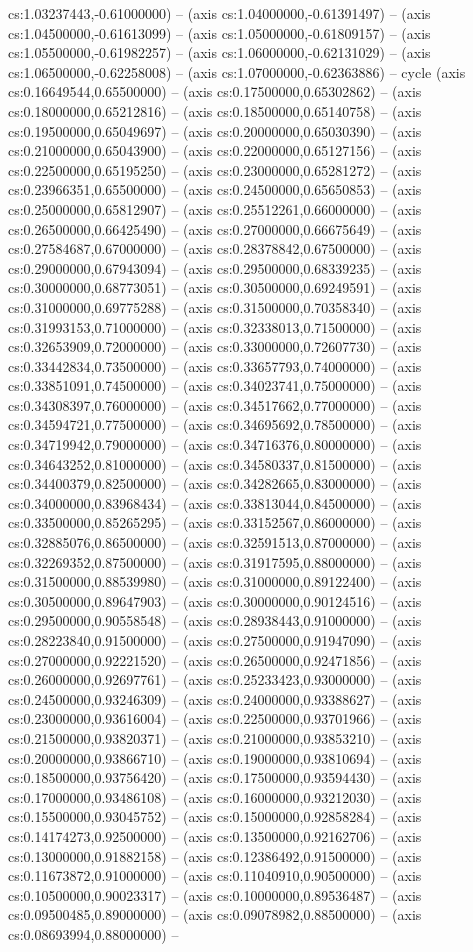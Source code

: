 cs:1.03237443,-0.61000000) -- (axis cs:1.04000000,-0.61391497) -- (axis cs:1.04500000,-0.61613099) -- (axis cs:1.05000000,-0.61809157) -- (axis cs:1.05500000,-0.61982257) -- (axis cs:1.06000000,-0.62131029) -- (axis cs:1.06500000,-0.62258008) -- (axis cs:1.07000000,-0.62363886) -- cycle (axis cs:0.16649544,0.65500000) -- (axis cs:0.17500000,0.65302862) -- (axis cs:0.18000000,0.65212816) -- (axis cs:0.18500000,0.65140758) -- (axis cs:0.19500000,0.65049697) -- (axis cs:0.20000000,0.65030390) -- (axis cs:0.21000000,0.65043900) -- (axis cs:0.22000000,0.65127156) -- (axis cs:0.22500000,0.65195250) -- (axis cs:0.23000000,0.65281272) -- (axis cs:0.23966351,0.65500000) -- (axis cs:0.24500000,0.65650853) -- (axis cs:0.25000000,0.65812907) -- (axis cs:0.25512261,0.66000000) -- (axis cs:0.26500000,0.66425490) -- (axis cs:0.27000000,0.66675649) -- (axis cs:0.27584687,0.67000000) -- (axis cs:0.28378842,0.67500000) -- (axis cs:0.29000000,0.67943094) -- (axis cs:0.29500000,0.68339235) -- (axis cs:0.30000000,0.68773051) -- (axis cs:0.30500000,0.69249591) -- (axis cs:0.31000000,0.69775288) -- (axis cs:0.31500000,0.70358340) -- (axis cs:0.31993153,0.71000000) -- (axis cs:0.32338013,0.71500000) -- (axis cs:0.32653909,0.72000000) -- (axis cs:0.33000000,0.72607730) -- (axis cs:0.33442834,0.73500000) -- (axis cs:0.33657793,0.74000000) -- (axis cs:0.33851091,0.74500000) -- (axis cs:0.34023741,0.75000000) -- (axis cs:0.34308397,0.76000000) -- (axis cs:0.34517662,0.77000000) -- (axis cs:0.34594721,0.77500000) -- (axis cs:0.34695692,0.78500000) -- (axis cs:0.34719942,0.79000000) -- (axis cs:0.34716376,0.80000000) -- (axis cs:0.34643252,0.81000000) -- (axis cs:0.34580337,0.81500000) -- (axis cs:0.34400379,0.82500000) -- (axis cs:0.34282665,0.83000000) -- (axis cs:0.34000000,0.83968434) -- (axis cs:0.33813044,0.84500000) -- (axis cs:0.33500000,0.85265295) -- (axis cs:0.33152567,0.86000000) -- (axis cs:0.32885076,0.86500000) -- (axis cs:0.32591513,0.87000000) -- (axis cs:0.32269352,0.87500000) -- (axis cs:0.31917595,0.88000000) -- (axis cs:0.31500000,0.88539980) -- (axis cs:0.31000000,0.89122400) -- (axis cs:0.30500000,0.89647903) -- (axis cs:0.30000000,0.90124516) -- (axis cs:0.29500000,0.90558548) -- (axis cs:0.28938443,0.91000000) -- (axis cs:0.28223840,0.91500000) -- (axis cs:0.27500000,0.91947090) -- (axis cs:0.27000000,0.92221520) -- (axis cs:0.26500000,0.92471856) -- (axis cs:0.26000000,0.92697761) -- (axis cs:0.25233423,0.93000000) -- (axis cs:0.24500000,0.93246309) -- (axis cs:0.24000000,0.93388627) -- (axis cs:0.23000000,0.93616004) -- (axis cs:0.22500000,0.93701966) -- (axis cs:0.21500000,0.93820371) -- (axis cs:0.21000000,0.93853210) -- (axis cs:0.20000000,0.93866710) -- (axis cs:0.19000000,0.93810694) -- (axis cs:0.18500000,0.93756420) -- (axis cs:0.17500000,0.93594430) -- (axis cs:0.17000000,0.93486108) -- (axis cs:0.16000000,0.93212030) -- (axis cs:0.15500000,0.93045752) -- (axis cs:0.15000000,0.92858284) -- (axis cs:0.14174273,0.92500000) -- (axis cs:0.13500000,0.92162706) -- (axis cs:0.13000000,0.91882158) -- (axis cs:0.12386492,0.91500000) -- (axis cs:0.11673872,0.91000000) -- (axis cs:0.11040910,0.90500000) -- (axis cs:0.10500000,0.90023317) -- (axis cs:0.10000000,0.89536487) -- (axis cs:0.09500485,0.89000000) -- (axis cs:0.09078982,0.88500000) -- (axis cs:0.08693994,0.88000000) -- 
